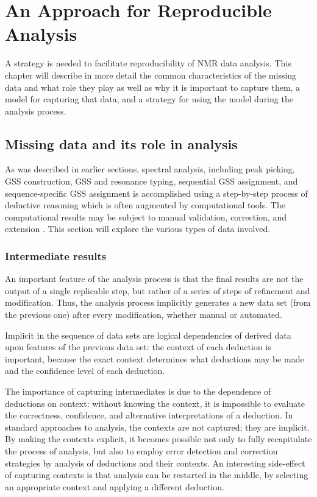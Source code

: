 \chapter{An Approach for Reproducible Analysis}

A strategy is needed to facilitate reproducibility of NMR data analysis.
This chapter will describe in more detail the common characteristics of
the missing data and what role they play as well as why it is important to
capture them, a model for capturing that data, and a strategy for using
the model during the analysis process.


\section{Missing data and its role in analysis}

As was described in earlier sections, 
spectral analysis, including peak picking, GSS construction, GSS and resonance
typing, sequential GSS assignment, and sequence-specific GSS assignment is 
accomplished using a step-by-step process of deductive reasoning 
which is often augmented by computational tools.  The computational 
results may be subject to manual validation, correction, and extension
\cite{guerry2011automated}.  This section will explore the various types
of data involved.

\subsection{Intermediate results}
An important feature of the analysis process is that the final results are
not the output of a single replicable step, but rather of a series of steps
of refinement and modification.  Thus, the analysis process implicitly 
generates a new data set (from the previous one) after every modification, 
whether manual or automated.

Implicit in the sequence of data sets are logical dependencies of derived
data upon features of the previous data set: the context of each deduction
is important, because the exact context determines what deductions may be
made and the confidence level of each deduction. %

The importance of capturing intermediates is due to the dependence of 
deductions on context: without knowing the context, it is impossible to 
evaluate the correctness, confidence, and alternative interpretations of
a deduction.  In standard approaches to analysis, the contexts are not
captured; they are implicit.  By making the contexts explicit, it becomes
possible not only to fully recapitulate the process of analysis, but also 
to employ error detection and correction strategies by analysis
of deductions and their contexts.  
An interesting side-effect of capturing
contexts is that analysis can be restarted in the middle, by selecting an
appropriate context and applying a different deduction.

